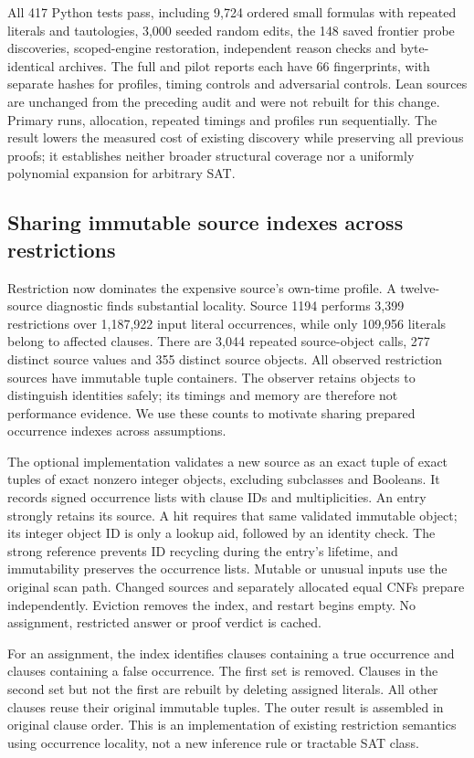 \documentclass[11pt,a4paper]{article}
\numberwithin{equation}{section}
\theoremstyle{plain}
\theoremstyle{definition}
\theoremstyle{remark}
\begin{document}
All 417 Python tests pass, including 9,724 ordered small formulas with repeated literals and tautologies, 3,000 seeded random edits, the 148 saved frontier probe discoveries, scoped-engine restoration, independent reason checks and byte-identical archives. The full and pilot reports each have 66 fingerprints, with separate hashes for profiles, timing controls and adversarial controls. Lean sources are unchanged from the preceding audit and were not rebuilt for this change. Primary runs, allocation, repeated timings and profiles run sequentially. The result lowers the measured cost of existing discovery while preserving all previous proofs; it establishes neither broader structural coverage nor a uniformly polynomial expansion for arbitrary SAT.

\subsection{Sharing immutable source indexes across restrictions}
\label{sec:indexed-restriction}

Restriction now dominates the expensive source's own-time profile. A twelve-source diagnostic finds substantial locality. Source 1194 performs 3,399 restrictions over 1,187,922 input literal occurrences, while only 109,956 literals belong to affected clauses. There are 3,044 repeated source-object calls, 277 distinct source values and 355 distinct source objects. All observed restriction sources have immutable tuple containers. The observer retains objects to distinguish identities safely; its timings and memory are therefore not performance evidence. We use these counts to motivate sharing prepared occurrence indexes across assumptions.

The optional implementation validates a new source as an exact tuple of exact tuples of exact nonzero integer objects, excluding subclasses and Booleans. It records signed occurrence lists with clause IDs and multiplicities. An entry strongly retains its source. A hit requires that same validated immutable object; its integer object ID is only a lookup aid, followed by an identity check. The strong reference prevents ID recycling during the entry's lifetime, and immutability preserves the occurrence lists. Mutable or unusual inputs use the original scan path. Changed sources and separately allocated equal CNFs prepare independently. Eviction removes the index, and restart begins empty. No assignment, restricted answer or proof verdict is cached.

For an assignment, the index identifies clauses containing a true occurrence and clauses containing a false occurrence. The first set is removed. Clauses in the second set but not the first are rebuilt by deleting assigned literals. All other clauses reuse their original immutable tuples. The outer result is assembled in original clause order. This is an implementation of existing restriction semantics using occurrence locality, not a new inference rule or tractable SAT class.
\end{document}
